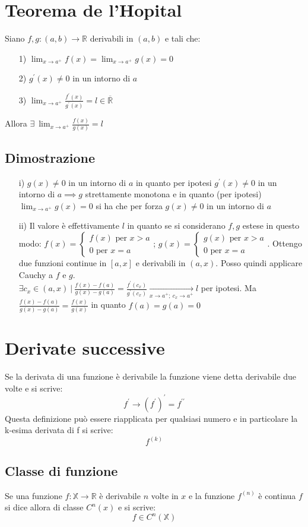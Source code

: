\section{Teorema de l'Hopital}
Siano $f,g: (a,b) \to \mathbb{R}$ derivabili in $(a,b)$ e tali che:
\begin{enumerate}
\item[1)] $\displaystyle \lim_{x \to a^+}f(x) = \lim_{x \to a^+}g(x) = 0$
\item[2)] $g^{\prime}(x) \neq 0$ in un intorno di $a$
\item[3)] $\displaystyle \lim_{x \to a^+}\frac{f^{\prime}(x)}{g^{\prime}(x)} = l \in \mathbb{\overline{R}}$
\end{enumerate}
Allora $\exists\ \displaystyle \lim_{x \to a^+}\frac{f(x)}{g(x)} = l$
\subsection{Dimostrazione}
\begin{enumerate}
\item[i)] $g(x) \neq 0$ in un intorno di $a$ in quanto per ipotesi $g^{\prime}(x) \neq 0$ in un intorno di $a \implies g$ strettamente monotona e in quanto (per ipotesi) $\displaystyle \lim_{x \to a^+}g(x) = 0$ si ha che per forza $g(x) \neq 0$ in un intorno di $a$
\item[ii)] Il valore è effettivamente $l$ in quanto se si considerano $f,g$ estese in questo modo:
$f(x) = \begin{cases}
f(x) \text{ per } x>a\\
0 \text{ per } x=a
\end{cases}$;
$g(x) = \begin{cases}
g(x) \text{ per } x>a\\
0 \text{ per } x=a
\end{cases}$. Ottengo due funzioni continue in $[a,x]$ e derivabili in $(a,x)$. Posso quindi applicare Cauchy a $f$ e $g$.\\
$\exists c_x \in (a,x)\ |\ \frac{f(x) - f(a)}{g(x) - g(a)} = \frac{f^{\prime}(c_x)}{g^{\prime}(c_x)} \xrightarrow[x \to a^+;\ c_x \to a^+]{} l$ per ipotesi. Ma $\frac{f(x) - f(a)}{g(x) - g(a)} = \frac{f(x)}{g(x)}$ in quanto $f(a) = g(a) = 0$
\end{enumerate}

\section{Derivate successive}
Se la derivata di una funzione è derivabile la funzione viene detta derivabile due volte e si scrive:
\begin{equation}
f^{\prime} \rightarrow (f^{\prime})^{\prime} = f^{\prime\prime}
\end{equation}
Questa definizione può essere riapplicata per qualsiasi numero e in particolare la k-esima derivata di f si scrive:
\begin{equation}
f^{(k)}
\end{equation}
\subsection{Classe di funzione}
Se una funzione $f: \mathbb{X} \to \mathbb{R}$ è derivabile $n$ volte in $x$ e la funzione $f^{(n)}$ è continua $f$ si dice allora di classe $C^{n}(x)$ e si scrive:
\begin{equation}
f \in C^{n}(\mathbb{X})
\end{equation}